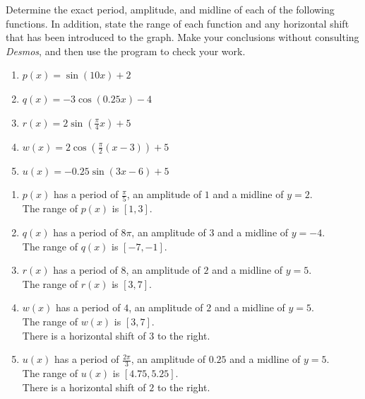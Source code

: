 \documentclass{ximera}
\begin{document}
\begin{example}
Determine the exact period, amplitude, and midline of each of the following functions.  In addition,  state the range of each function and any horizontal shift that has been introduced to the graph.  Make your conclusions without consulting \emph{Desmos}, and then use the program to check your work.%

\begin{enumerate}[label=\alph*.]
\item
\(p(x) = \sin(10x) + 2\)%
\item
\(q(x) = -3\cos(0.25x) - 4\)%
\item
\(r(x) = 2\sin\left( \frac{\pi}{4} x\right) + 5\)%
\item
\(w(x) = 2\cos\left( \frac{\pi}{2} (x-3) \right) + 5\)%
\item
\(u(x) = -0.25\sin\left(3x-6\right) + 5\)%
\end{enumerate}
\begin{explanation}
\begin{enumerate}[label=\alph*.]
\item
$p(x)$ has a period of $\frac{\pi}{5}$, an amplitude of $1$ and a midline of $y=2$. \\
The range of $p(x)$ is $[1,3]$.
\item
$q(x)$ has a period of $8\pi$, an amplitude of $3$ and a midline of $y=-4$. \\
The range of $q(x)$ is $[-7, -1]$.
\item
$r(x)$ has a period of $8$, an amplitude of $2$ and a midline of $y=5$. \\
 The range of $r(x)$ is $[3, 7]$.
\item
$w(x)$ has a period of $4$, an amplitude of $2$ and a midline of $y=5$.\\
The range of $w(x)$ is $[3, 7]$. \\
There is a horizontal shift of $3$ to the right.
\item
$u(x)$ has a period of $\frac{2\pi}{3}$, an amplitude of $0.25$ and a midline of $y=5$. \\
The range of $u(x)$ is $[4.75, 5.25]$. \\
There is a horizontal shift of $2$ to the right.
\end{enumerate}
\end{explanation}
\end{example}
\end{document}
